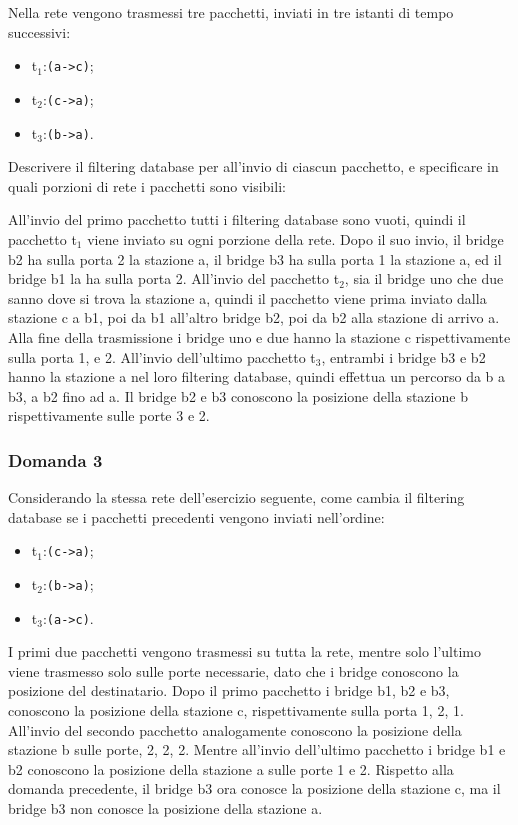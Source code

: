 \documentclass{article}
\numberwithin{equation}{subsection}
\begin{document}
Nella rete vengono trasmessi tre pacchetti, inviati in tre istanti di tempo successivi:
\begin{itemize}
    \item t$_1$:\verb|(a->c)|;
    \item t$_2$:\verb|(c->a)|;
    \item t$_3$:\verb|(b->a)|. 
\end{itemize}

Descrivere il filtering database per all'invio di ciascun pacchetto, e specificare in quali porzioni di rete i pacchetti sono visibili:

All'invio del primo pacchetto tutti i filtering database sono vuoti, quindi il pacchetto t$_1$ viene inviato su ogni porzione della rete. Dopo il suo invio, il 
bridge b2 ha sulla porta 2 la stazione a, il bridge b3 ha sulla porta 1 la stazione a, ed il bridge b1 la ha sulla porta 2. 
All'invio del pacchetto t$_2$, sia il bridge uno che due sanno dove si trova la stazione a, quindi il pacchetto viene prima inviato dalla stazione c a b1, poi da b1 
all'altro bridge b2, poi da b2 alla stazione di arrivo a. Alla fine della trasmissione i bridge uno e due hanno la stazione c rispettivamente sulla porta 1, e 2. 
All'invio dell'ultimo pacchetto t$_3$, entrambi i bridge b3 e b2 hanno la stazione a nel loro filtering database, quindi effettua un percorso da b a b3, a b2 fino ad a. 
Il bridge b2 e b3 conoscono la posizione della stazione b rispettivamente sulle porte 3 e 2. 


\subsubsection*{Domanda 3}

Considerando la stessa rete dell'esercizio seguente, come cambia il filtering database se i pacchetti precedenti vengono inviati nell'ordine:
\begin{itemize}
    \item t$_1$:\verb|(c->a)|;
    \item t$_2$:\verb|(b->a)|;
    \item t$_3$:\verb|(a->c)|. 
\end{itemize}

I primi due pacchetti vengono trasmessi su tutta la rete, mentre solo l'ultimo viene trasmesso solo sulle porte necessarie, dato che i bridge conoscono la posizione 
del destinatario. 
Dopo il primo pacchetto i bridge b1, b2 e b3, conoscono la posizione della stazione c, rispettivamente sulla porta 1, 2, 1. All'invio del secondo pacchetto analogamente 
conoscono la posizione della stazione b sulle porte, 2, 2, 2. Mentre all'invio dell'ultimo pacchetto i bridge b1 e b2 conoscono la posizione della stazione a sulle porte 
1 e 2. 
Rispetto alla domanda precedente, il bridge b3 ora conosce la posizione della stazione c, ma il bridge b3 non conosce la posizione della stazione a. 
\end{document}
